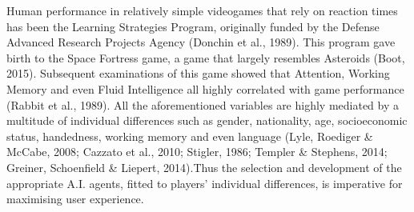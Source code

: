 Human performance in relatively simple videogames that rely on reaction times has been the Learning Strategies Program, originally funded by the Defense Advanced Research Projects Agency (Donchin et al., 1989). This program gave birth to the Space Fortress game, a game that  largely resembles Asteroids (Boot, 2015). Subsequent examinations of this game showed that Attention, Working Memory and even Fluid Intelligence all highly correlated with game performance (Rabbit et al., 1989). All the aforementioned variables are highly mediated by a multitude of individual differences such as gender, nationality, age, socioeconomic status, handedness, working memory and even language (Lyle, Roediger \& McCabe, 2008; Cazzato et al., 2010; Stigler, 1986; Templer \& Stephens, 2014; Greiner, Schoenfield \& Liepert, 2014).Thus the selection and development of the appropriate A.I. agents, fitted to players’ individual differences, is imperative for maximising user experience. 
